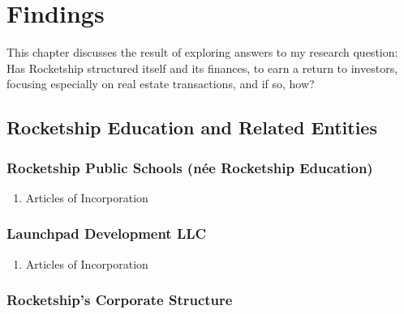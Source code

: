 
\chapter{Findings}\label{ch:results}\noindent
\bigskip%

This chapter discusses the result of exploring answers to my research question: Has Rocketship structured itself and its finances, to earn a return to investors, focusing especially on real estate transactions, and if so, how?

\section{Rocketship Education and Related Entities}
\subsection{Rocketship Public Schools (née Rocketship Education)}
\begin{enumerate}
  \item Articles of Incorporation
\end{enumerate}
\subsection{Launchpad Development LLC}
\begin{enumerate}
  \item Articles of Incorporation
\end{enumerate}

\subsection{Rocketship's Corporate Structure}\label{sec:rocketship-corp-struct}\indent


